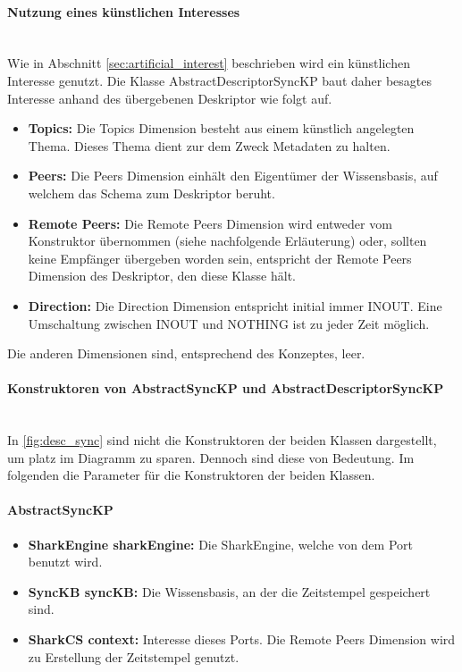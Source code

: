 \documentclass[a4paper]{article}
\begin{document}
	\paragraph{Nutzung eines künstlichen Interesses}\mbox{} \\
	
	Wie in Abschnitt \ref{sec:artificial_interest} beschrieben wird ein künstlichen
	Interesse genutzt. Die Klasse AbstractDescriptorSyncKP baut daher besagtes
	Interesse anhand des übergebenen Deskriptor wie folgt auf. 
	
	\begin{itemize}
		\item \textbf{Topics:} Die Topics Dimension besteht aus einem künstlich
		angelegten Thema. Dieses Thema dient zur dem Zweck Metadaten zu halten.
		\item \textbf{Peers:} Die Peers Dimension einhält den Eigentümer der
		Wissensbasis, auf welchem das Schema zum Deskriptor beruht.
		\item \textbf{Remote Peers:} Die Remote Peers Dimension wird entweder
		vom Konstruktor übernommen (siehe nachfolgende Erläuterung) oder, sollten
		keine Empfänger übergeben worden sein, entspricht der Remote Peers Dimension
		des Deskriptor, den diese Klasse hält.
		\item \textbf{Direction:} Die Direction Dimension entspricht initial
		immer INOUT. Eine Umschaltung zwischen INOUT und NOTHING ist zu jeder Zeit
		möglich.
	\end{itemize}
	
	Die anderen Dimensionen sind, entsprechend des Konzeptes, leer.
	
	\paragraph{Konstruktoren von AbstractSyncKP und AbstractDescriptorSyncKP}
	\mbox{} \\
	
	In \autoref{fig:desc_sync} sind nicht die Konstruktoren der beiden Klassen
	dargestellt, um platz im Diagramm zu sparen. Dennoch sind diese von Bedeutung.
	Im folgenden die Parameter für die Konstruktoren der beiden Klassen.
	
	\paragraph{AbstractSyncKP}
	
	\begin{itemize}
		\item \textbf{SharkEngine sharkEngine:} Die SharkEngine, welche von
		dem Port benutzt wird.
		\item \textbf{SyncKB syncKB:} Die Wissensbasis, an der die Zeitstempel
		 gespeichert sind.
		\item \textbf{SharkCS context:} Interesse dieses Ports. Die Remote Peers
		Dimension wird zu Erstellung der Zeitstempel genutzt.
	\end{itemize}
	
\end{document}
